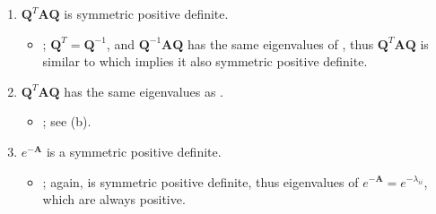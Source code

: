 \begin{itemize}
\begin{enumerate}
{\begin{enumerate}
        \item \(\bm{Q}^T \bm{AQ}\) is symmetric positive definite.
        \begin{itemize}\color{foreground}
          \item {}; \(\bm{Q}^T = \bm{Q}^{-1}\), and \(\bm{Q}^{-1}
            \bm{AQ}\) has the same eigenvalues of , thus \(\bm{Q}^T
            \bm{AQ} \) is similar to  which implies it also symmetric
            positive definite.
        \end{itemize}

        \item \(\bm{Q}^T \bm{AQ}\) has the same eigenvalues as .
        \begin{itemize}\color{foreground}
          \item {}; see (b).
        \end{itemize}

        \item \(e^{-\bm{A}} \) is a symmetric positive definite.
        \begin{itemize}\color{foreground}
          \item {}; again,  is symmetric positive definite,
            thus eigenvalues of \(e^{-\bm{A}} = e^{-\lambda_{ii} } \), which
            are always positive.
        \end{itemize}

      \end{enumerate}
    }
  \end{enumerate}
\end{itemize}
